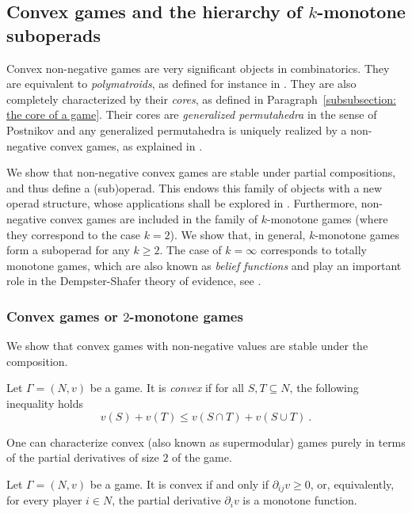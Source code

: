 \documentclass[a4paper,12pt]{amsart}
\begin{document}
\subsection{Convex games and the hierarchy of $k$-monotone suboperads}
Convex non-negative games are very significant objects in combinatorics. They are equivalent to \textit{polymatroids}, as defined for instance in \cite[Definition 1.1]{Polymatroids}. They are also completely characterized by their \textit{cores}, as defined in Paragraph~\ref{subsubsection: the core of a game}. Their cores are \textit{generalized permutahedra} in the sense of Postnikov \cite{Postnikov} and any generalized permutahedra is uniquely realized by a non-negative convex games, as explained in \cite[Section 12]{AguiarArdila}.

\medskip

We show that non-negative convex games are stable under partial compositions, and thus define a (sub)operad. This endows this family of objects with a new operad structure, whose applications shall be explored in \cite{deuxiemepapier}. Furthermore, non-negative convex games are included in the family of $k$-monotone games (where they correspond to the case $k =2$). We show that, in general, $k$-monotone games form a suboperad for any $k \geq 2$. The case of $k = \infty$ corresponds to totally monotone games, which are also known as \textit{belief functions} and play an important role in the Dempster-Shafer theory of evidence, see \cite{dempster1967upper, shafer1976mathematical, kohlas2013mathematical}. 

\subsubsection{Convex games or $2$-monotone games}
We show that convex games with non-negative values are stable under the composition. 

\begin{definition}\label{definition: convex game}
Let $\Gamma = (N,v)$ be a game. It is \textit{convex} if for all $S,T \subseteq N$, the following inequality holds
\[
v(S) + v(T) \leq v(S \cap T) + v(S \cup T)~. 
\]
\end{definition}

One can characterize convex (also known as supermodular) games purely in terms of the partial derivatives of size $2$ of the game. 

\begin{proposition}\label{prop: convex-characterization}
Let $\Gamma = (N,v)$ be a game. It is convex if and only if $\partial_{ij} v \geq 0$, or, equivalently, for every player $i \in N$, the partial derivative $\partial_i v$ is a monotone function. 
\end{proposition}
\end{document}
